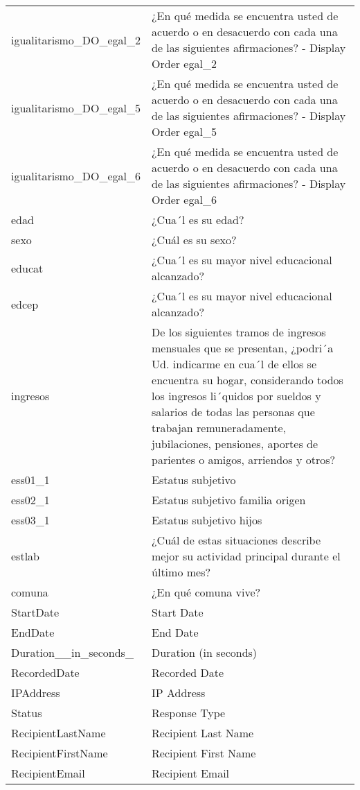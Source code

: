 \documentclass[
  10,
  landscape,
  legalpaper]{article}
\begin{document}
\begin{table}
{\begin{tabular}{l>{\raggedright\arraybackslash}p{10cm}}
igualitarismo\_DO\_egal\_2 & ¿En    qué    medida    se    encuentra    usted    de    acuerdo    o    en    desacuerdo    con    cada    una    de    las    siguientes    afirmaciones? - Display Order egal\_2\\
igualitarismo\_DO\_egal\_5 & ¿En    qué    medida    se    encuentra    usted    de    acuerdo    o    en    desacuerdo    con    cada    una    de    las    siguientes    afirmaciones? - Display Order egal\_5\\
igualitarismo\_DO\_egal\_6 & ¿En    qué    medida    se    encuentra    usted    de    acuerdo    o    en    desacuerdo    con    cada    una    de    las    siguientes    afirmaciones? - Display Order egal\_6\\
edad & ¿Cua´l es su edad?\\
\addlinespace
sexo & ¿Cuál es su sexo?\\
educat & ¿Cua´l es su mayor nivel educacional alcanzado?\\
edcep & ¿Cua´l es su mayor nivel educacional alcanzado?\\
ingresos & De los siguientes tramos de ingresos mensuales que se presentan, ¿podri´a Ud. indicarme en cua´l de ellos se encuentra su hogar, considerando todos los ingresos li´quidos por sueldos y salarios de todas las personas que trabajan remuneradamente, jubilaciones, pensiones, aportes de parientes o amigos, arriendos y otros?\\
ess01\_1 & Estatus subjetivo\\
\addlinespace
ess02\_1 & Estatus subjetivo familia origen\\
ess03\_1 & Estatus subjetivo hijos\\
estlab & ¿Cuál de estas situaciones describe mejor su actividad principal durante el último mes?\\
comuna & ¿En qué comuna vive?\\
StartDate & Start Date\\
\addlinespace
EndDate & End Date\\
Duration\_\_in\_seconds\_ & Duration (in seconds)\\
RecordedDate & Recorded Date\\
IPAddress & IP Address\\
Status & Response Type\\
\addlinespace
RecipientLastName & Recipient Last Name\\
RecipientFirstName & Recipient First Name\\
RecipientEmail & Recipient Email\\

\end{tabular}}
\end{table}
\end{document}
